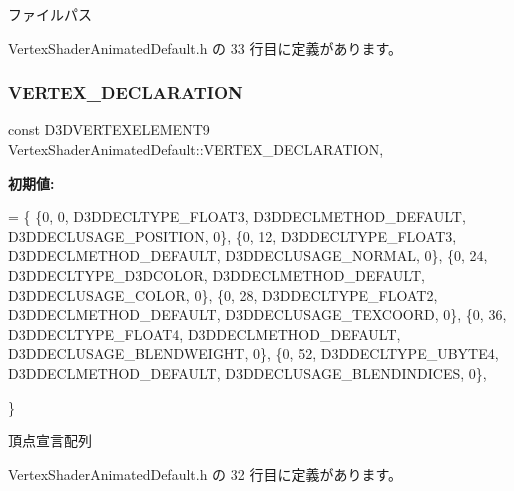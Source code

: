 ファイルパス 



 Vertex\+Shader\+Animated\+Default.\+h の 33 行目に定義があります。

\mbox{\label{class_vertex_shader_animated_default_ab2b136b8350457a6113a5ffe28d359e3}} 
\subsubsection{\texorpdfstring{V\+E\+R\+T\+E\+X\+\_\+\+D\+E\+C\+L\+A\+R\+A\+T\+I\+ON}{VERTEX\_DECLARATION}}
{\footnotesize\ttfamily const D3\+D\+V\+E\+R\+T\+E\+X\+E\+L\+E\+M\+E\+N\+T9 Vertex\+Shader\+Animated\+Default\+::\+V\+E\+R\+T\+E\+X\+\_\+\+D\+E\+C\+L\+A\+R\+A\+T\+I\+ON\hspace{0.3cm}{\ttfamily [static]}, {\ttfamily [private]}}

{\bfseries 初期値\+:}
\begin{DoxyCode}
=
\{
    \{0, 0, D3DDECLTYPE\_FLOAT3, D3DDECLMETHOD\_DEFAULT, D3DDECLUSAGE\_POSITION, 0\},
    \{0, 12, D3DDECLTYPE\_FLOAT3, D3DDECLMETHOD\_DEFAULT, D3DDECLUSAGE\_NORMAL, 0\},
    \{0, 24, D3DDECLTYPE\_D3DCOLOR, D3DDECLMETHOD\_DEFAULT, D3DDECLUSAGE\_COLOR, 0\},
    \{0, 28, D3DDECLTYPE\_FLOAT2, D3DDECLMETHOD\_DEFAULT, D3DDECLUSAGE\_TEXCOORD, 0\},
    \{0, 36, D3DDECLTYPE\_FLOAT4, D3DDECLMETHOD\_DEFAULT, D3DDECLUSAGE\_BLENDWEIGHT, 0\},
    \{0, 52, D3DDECLTYPE\_UBYTE4, D3DDECLMETHOD\_DEFAULT, D3DDECLUSAGE\_BLENDINDICES, 0\},

\}
\end{DoxyCode}


頂点宣言配列 



 Vertex\+Shader\+Animated\+Default.\+h の 32 行目に定義があります。

\mbox{\label{class_vertex_shader_animated_default_af09cbf7cd74f29c79d96333b7fe922db}} 
